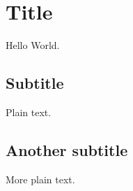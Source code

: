 \documentclass{article}
\begin{document}
\section{Title}
Hello World.
\subsection{Subtitle}

Plain text.

\subsection{Another subtitle}

More plain text.
\end{document}
